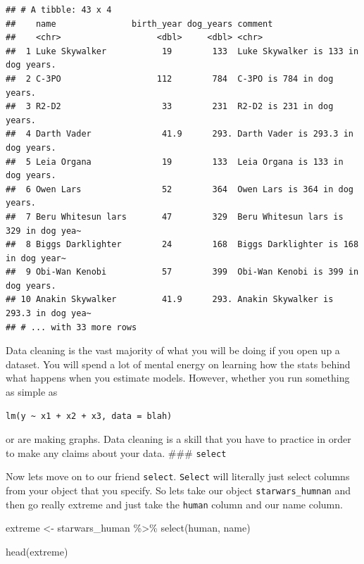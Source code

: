 \documentclass[]{tufte-handout}
\newenvironment{Shaded}{}{}
\newcommand{\FunctionTok}[1]{\textcolor[rgb]{0.02,0.16,0.49}{#1}}
\newcommand{\NormalTok}[1]{#1}
\newcommand{\OtherTok}[1]{\textcolor[rgb]{0.00,0.44,0.13}{#1}}
\newcommand{\SpecialCharTok}[1]{\textcolor[rgb]{0.25,0.44,0.63}{#1}}
\begin{document}
\begin{verbatim}
## # A tibble: 43 x 4
##    name               birth_year dog_years comment                              
##    <chr>                   <dbl>     <dbl> <chr>                                
##  1 Luke Skywalker           19        133  Luke Skywalker is 133 in dog years.  
##  2 C-3PO                   112        784  C-3PO is 784 in dog years.           
##  3 R2-D2                    33        231  R2-D2 is 231 in dog years.           
##  4 Darth Vader              41.9      293. Darth Vader is 293.3 in dog years.   
##  5 Leia Organa              19        133  Leia Organa is 133 in dog years.     
##  6 Owen Lars                52        364  Owen Lars is 364 in dog years.       
##  7 Beru Whitesun lars       47        329  Beru Whitesun lars is 329 in dog yea~
##  8 Biggs Darklighter        24        168  Biggs Darklighter is 168 in dog year~
##  9 Obi-Wan Kenobi           57        399  Obi-Wan Kenobi is 399 in dog years.  
## 10 Anakin Skywalker         41.9      293. Anakin Skywalker is 293.3 in dog yea~
## # ... with 33 more rows
\end{verbatim}

Data cleaning is the vast majority of what you will be doing if you open
up a dataset. You will spend a lot of mental energy on learning how the
stats behind what happens when you estimate models. However, whether you
run something as simple as

\begin{verbatim}
lm(y ~ x1 + x2 + x3, data = blah)
\end{verbatim}

or are making graphs. Data cleaning is a skill that you have to practice
in order to make any claims about your data. \#\#\# \texttt{select}

Now lets move on to our friend \texttt{select}. \texttt{Select} will
literally just select columns from your object that you specify. So lets
take our object \texttt{starwars\_humnan} and then go really extreme and
just take the \texttt{human} column and our name column.

\begin{Shaded}
\begin{Highlighting}[]
\NormalTok{extreme }\OtherTok{\textless{}{-}}\NormalTok{ starwars\_human }\SpecialCharTok{\%\textgreater{}\%}
  \FunctionTok{select}\NormalTok{(human, name)}

\FunctionTok{head}\NormalTok{(extreme)}
\end{Highlighting}
\end{Shaded}
\end{document}
